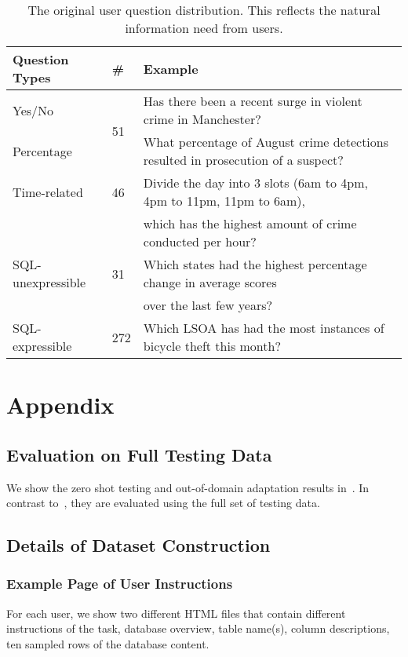 \documentclass[11pt,a4paper]{article}
\begin{document}
\begin{table*}[t]
    \small
    \centering
    \caption{The original user question distribution. This reflects the natural information need from users.}
    \label{tab:question_distribution}
    \begin{tabular}{lll}
        \toprule
        \textbf{Question Types}  & \# &  Example \\
        \midrule
        Yes/No &   \multirow{2}{*}{51} & Has there been a recent surge in violent crime in Manchester? \\
        Percentage &   &  What percentage of August crime detections resulted in prosecution of a suspect? \\
        \midrule
        Time-related & 46 & Divide the day into 3 slots (6am to 4pm, 4pm to 11pm, 11pm to 6am), \\
                     & & which has the highest amount of crime conducted per hour? \\
        SQL-unexpressible &  31 & Which states had the highest percentage change in average scores \\
                          & & over the last few years? \\
        SQL-expressible & 272 &  Which LSOA has had the most instances of bicycle theft this month?  \\
        \bottomrule
    \end{tabular}
\end{table*}

\appendix
\section{Appendix}
\subsection{Evaluation on Full Testing Data}
We show the zero shot testing and out-of-domain adaptation results in~.
In contrast to~, they are evaluated using the full set of testing data.

\subsection{Details of Dataset Construction}
\subsubsection{Example Page of User Instructions}
For each user, we show two different HTML files that contain different instructions of the task, database overview, table name(s), column descriptions, ten sampled rows of the database content.
\end{document}
